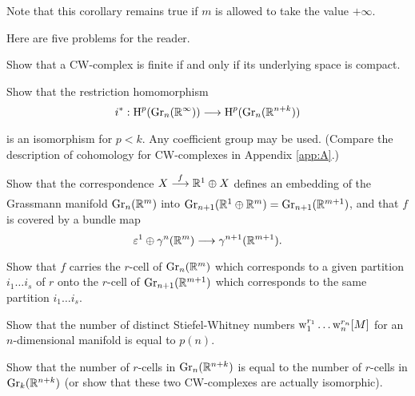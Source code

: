 \documentclass[../main]{subfiles}
\begin{document}
Note that this corollary remains true if $m$ is allowed to take the value $+\infty$.\medskip

Here are five problems for the reader.
\begin{problem}
\label{prob:06.01}
Show that a CW-complex is finite if and only if its underlying space is compact.
\end{problem}
\begin{problem}\label{prob-6-B}
Show that the restriction homomorphism
\[
i^\ast : \homology^{p}(\grassmannian_{n}(\bR^{\infty}))\varrightarrow{} \homology^{p}(\grassmannian_{n}(\bR^{n+k}))
\]
is an isomorphism for $p<k$. Any coefficient group may be used. (Compare the description of cohomology for CW-complexes in Appendix \ref{app:A}.)
\end{problem}
\begin{problem}
\label{prob:06.03}
Show that the correspondence $X \varrightarrow{f} \bR^{1} \oplus X$ defines an embedding of the Grassmann manifold $\operatorname{Gr}_{n}(\mathbb R^m)$ into $\operatorname{Gr}_{n+1}(\mathbb R^{1} \oplus \mathbb R^{m})=\operatorname{Gr}_{n+1}(\mathbb R^{m+1})$, and that $f$ is covered by a bundle map
\[
\trivialbundle^{1} \oplus \tautological^{n}(\bR^m) \varrightarrow{} \tautological^{n+1}(\bR^{m+1}).
\]
Show that $f$ carries the $r$-cell of $\operatorname{Gr}_{n}(\mathbb R^{m})$ which corresponds to a given partition $i_{1}\dots i_{s}$ of $r$ onto the $r$-cell of $\operatorname{Gr}_{n+1}(\mathbb R^{m+1})$ which corresponds to the same partition $i_{1}\dots i_{s}$.
\end{problem}
\begin{problem}
\label{prob:06.04}
Show that the number of distinct Stiefel-Whitney numbers $\operatorname{w}_{1}^{r_{1}}\dots \operatorname{w}_{n}^{r_{n}}[M]$ for an $n$-dimensional manifold is equal to $p(n)$.
\end{problem} 
\begin{problem}
\label{prob:06.05}
Show that the number of $r$-cells in $\operatorname{Gr}_{n}(\mathbb R^{n+k})$ is equal to the number of $r$-cells in $\operatorname{Gr}_{k}(\mathbb R^{n+k})$ (or show that these two CW-complexes are actually isomorphic).
\end{problem}
\end{document}
